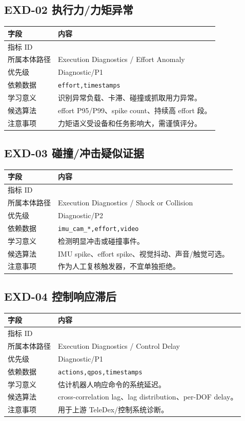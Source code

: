 \documentclass[UTF8,zihao=-4,oneside,openany]{ctexrep}
\newcommand{\Code}[1]{\texttt{#1}}
\newcommand{\MID}[1]{\texttt{\seqsplit{#1}}}
\begin{document}
\subsection{EXD-02 执行力/力矩异常}

\begin{longtable}{L{3.6cm} L{9.6cm}}
\toprule
字段 & 内容 \\
\midrule
指标 ID & \MID{EXD-02} \\
所属本体路径 & Execution Diagnostics / Effort Anomaly \\
优先级 & Diagnostic/P1 \\
依赖数据 & \Code{effort,timestamps} \\
学习意义 & 识别异常负载、卡滞、碰撞或抓取用力异常。 \\
候选算法 & effort P95/P99、spike count、持续高 effort 段。 \\
注意事项 & 力矩语义受设备和任务影响大，需谨慎评分。 \\
\bottomrule
\end{longtable}

\subsection{EXD-03 碰撞/冲击疑似证据}

\begin{longtable}{L{3.6cm} L{9.6cm}}
\toprule
字段 & 内容 \\
\midrule
指标 ID & \MID{EXD-03} \\
所属本体路径 & Execution Diagnostics / Shock or Collision \\
优先级 & Diagnostic/P2 \\
依赖数据 & \Code{imu\_cam\_*,effort,video} \\
学习意义 & 检测明显冲击或碰撞事件。 \\
候选算法 & IMU spike、effort spike、视觉抖动、声音/触觉可选。 \\
注意事项 & 作为人工复核触发器，不宜单独拒绝。 \\
\bottomrule
\end{longtable}

\subsection{EXD-04 控制响应滞后}

\begin{longtable}{L{3.6cm} L{9.6cm}}
\toprule
字段 & 内容 \\
\midrule
指标 ID & \MID{EXD-04} \\
所属本体路径 & Execution Diagnostics / Control Delay \\
优先级 & Diagnostic/P1 \\
依赖数据 & \Code{actions,qpos,timestamps} \\
学习意义 & 估计机器人响应命令的系统延迟。 \\
候选算法 & cross-correlation lag、lag distribution、per-DOF delay。 \\
注意事项 & 用于上游 TeleDex/控制系统诊断。 \\
\bottomrule
\end{longtable}
\end{document}
